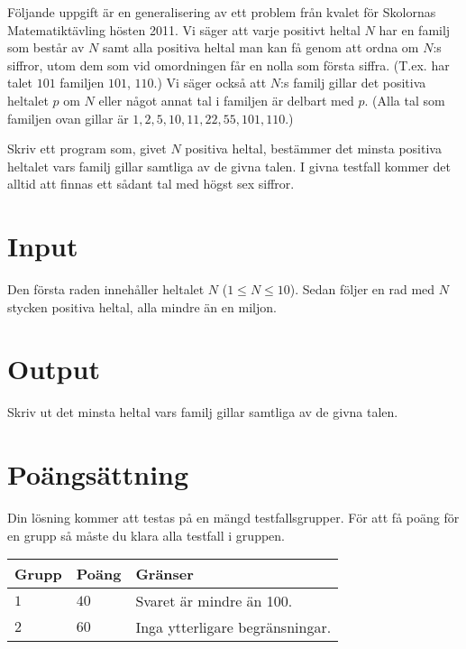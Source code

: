 Följande uppgift är en generalisering av ett problem från kvalet för Skolornas Matematiktävling hösten 2011. Vi säger att varje positivt heltal $N$ har en familj som består av $N$ samt alla positiva heltal man kan få genom att ordna om $N$:s siffror, utom dem som vid omordningen får en nolla som första siffra. (T.ex. har talet $101$ familjen $101$, $110$.) Vi säger också att $N$:s familj gillar det positiva heltalet $p$ om $N$ eller något annat tal i familjen är delbart med $p$. (Alla tal som familjen ovan gillar är $1,2,5,10,11,22,55,101,110$.)

Skriv ett program som, givet $N$ positiva heltal, bestämmer det minsta positiva heltalet vars familj gillar samtliga av de givna talen. I givna testfall kommer det alltid att finnas ett sådant tal med högst sex siffror.  
\section*{Input}
Den första raden innehåller heltalet $N$ ($1\leq N \leq 10$). Sedan följer en rad med $N$ stycken positiva heltal, alla mindre än en miljon.

\section*{Output}
Skriv ut det minsta heltal vars familj gillar samtliga av de givna talen.

\section*{Poängsättning}
Din lösning kommer att testas på en mängd testfallsgrupper.
För att få poäng för en grupp så måste du klara alla testfall i gruppen.

\noindent
\begin{tabular}{| l | l | p{12cm} |}
  \hline
  \textbf{Grupp} & \textbf{Poäng} & \textbf{Gränser} \\ \hline
  $1$    & $40$          & Svaret är mindre än 100.  \\ \hline
  $2$    & $60$          & Inga ytterligare begränsningar.  \\ \hline
\end{tabular}

